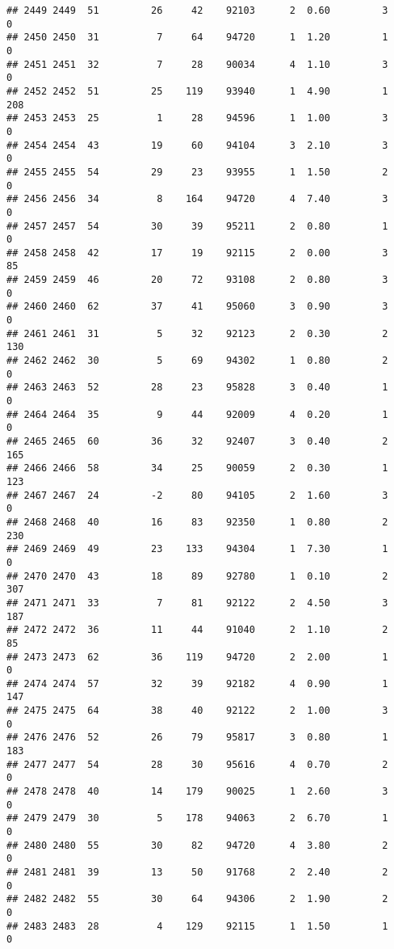 \documentclass[
]{article}
\begin{document}
\begin{verbatim}
## 2449 2449  51         26     42    92103      2  0.60         3        0
## 2450 2450  31          7     64    94720      1  1.20         1        0
## 2451 2451  32          7     28    90034      4  1.10         3        0
## 2452 2452  51         25    119    93940      1  4.90         1      208
## 2453 2453  25          1     28    94596      1  1.00         3        0
## 2454 2454  43         19     60    94104      3  2.10         3        0
## 2455 2455  54         29     23    93955      1  1.50         2        0
## 2456 2456  34          8    164    94720      4  7.40         3        0
## 2457 2457  54         30     39    95211      2  0.80         1        0
## 2458 2458  42         17     19    92115      2  0.00         3       85
## 2459 2459  46         20     72    93108      2  0.80         3        0
## 2460 2460  62         37     41    95060      3  0.90         3        0
## 2461 2461  31          5     32    92123      2  0.30         2      130
## 2462 2462  30          5     69    94302      1  0.80         2        0
## 2463 2463  52         28     23    95828      3  0.40         1        0
## 2464 2464  35          9     44    92009      4  0.20         1        0
## 2465 2465  60         36     32    92407      3  0.40         2      165
## 2466 2466  58         34     25    90059      2  0.30         1      123
## 2467 2467  24         -2     80    94105      2  1.60         3        0
## 2468 2468  40         16     83    92350      1  0.80         2      230
## 2469 2469  49         23    133    94304      1  7.30         1        0
## 2470 2470  43         18     89    92780      1  0.10         2      307
## 2471 2471  33          7     81    92122      2  4.50         3      187
## 2472 2472  36         11     44    91040      2  1.10         2       85
## 2473 2473  62         36    119    94720      2  2.00         1        0
## 2474 2474  57         32     39    92182      4  0.90         1      147
## 2475 2475  64         38     40    92122      2  1.00         3        0
## 2476 2476  52         26     79    95817      3  0.80         1      183
## 2477 2477  54         28     30    95616      4  0.70         2        0
## 2478 2478  40         14    179    90025      1  2.60         3        0
## 2479 2479  30          5    178    94063      2  6.70         1        0
## 2480 2480  55         30     82    94720      4  3.80         2        0
## 2481 2481  39         13     50    91768      2  2.40         2        0
## 2482 2482  55         30     64    94306      2  1.90         2        0
## 2483 2483  28          4    129    92115      1  1.50         1        0

\end{verbatim}
\end{document}
